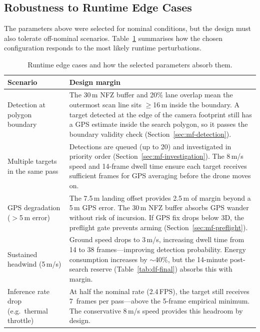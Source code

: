 \subsection{Robustness to Runtime Edge Cases}\label{sec:df-robustness}

The parameters above were selected for nominal conditions, but the design must also tolerate off-nominal scenarios. Table~\ref{tab:df-robustness} summarises how the chosen configuration responds to the most likely runtime perturbations.

\begin{table}[H]
  \centering\compactTable
  \caption{Runtime edge cases and how the selected parameters absorb them.}\label{tab:df-robustness}
  \begin{tabularx}{\linewidth}{@{}l X@{}}
    \toprule
    \textbf{Scenario} & \textbf{Design margin} \\
    \midrule
    Detection at polygon boundary &
      The 30\,m NFZ buffer and 20\% lane overlap mean the outermost scan line sits $\geq$16\,m inside the boundary. A target detected at the edge of the camera footprint still has a GPS estimate inside the search polygon, so it passes the boundary validity check (Section~\ref{sec:mf-detection}). \\
    Multiple targets in the same pass &
      Detections are queued (up to 20) and investigated in priority order (Section~\ref{sec:mf-investigation}). The 8\,m/s speed and 14-frame dwell time ensure each target receives sufficient frames for GPS averaging before the drone moves on. \\
    GPS degradation ($>$5\,m error) &
      The 7.5\,m landing offset provides 2.5\,m of margin beyond a 5\,m GPS error. The 30\,m NFZ buffer absorbs GPS wander without risk of incursion. If GPS fix drops below 3D, the preflight gate prevents arming (Section~\ref{sec:mf-preflight}). \\
    Sustained headwind (5\,m/s) &
      Ground speed drops to 3\,m/s, increasing dwell time from 14 to 38 frames---improving detection probability. Energy consumption increases by $\sim$40\%, but the 14-minute post-search reserve (Table~\ref{tab:df-final}) absorbs this with margin. \\
    Inference rate drop (e.g.\ thermal throttle) &
      At half the nominal rate (2.4\,FPS), the target still receives 7~frames per pass---above the 5-frame empirical minimum. The conservative 8\,m/s speed provides this headroom by design. \\
    \bottomrule
  \end{tabularx}
\end{table}

